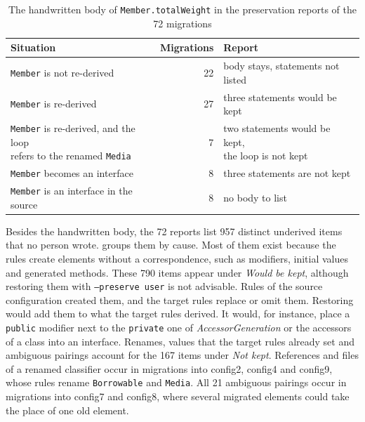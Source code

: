 \begin{table}[htbp]
    \centering
    \begin{tabular}{|l|r|l|}
        \hline
        \textbf{Situation}                            & \textbf{Migrations} & \textbf{Report}                   \\
        \hline
        \texttt{Member} is not re-derived             & 22                  & body stays, statements not listed \\
        \hline
        \texttt{Member} is re-derived                 & 27                  & three statements would be kept    \\
        \hline
        \makecell[l]{\texttt{Member} is re-derived, and the loop                                                \\ refers to the renamed \texttt{Media}} & 7 & \makecell[l]{two statements would be kept, \\ the loop is not kept} \\
        \hline
        \texttt{Member} becomes an interface          & 8                   & three statements are not kept     \\
        \hline
        \texttt{Member} is an interface in the source & 8                   & no body to list                   \\
        \hline
    \end{tabular}
    \caption{The handwritten body of \texttt{Member.totalWeight} in the preservation reports of the 72 migrations}
    \label{table:preservation-handwritten}
\end{table}

Besides the handwritten body, the 72 reports list 957 distinct underived items that no person wrote.
 groups them by cause.
Most of them exist because the rules create elements without a correspondence, such as modifiers, initial values and generated methods.
These 790 items appear under \textit{Would be kept}, although restoring them with \texttt{--preserve user} is not advisable.
Rules of the source configuration created them, and the target rules replace or omit them.
Restoring would add them to what the target rules derived.
It would, for instance, place a \texttt{public} modifier next to the \texttt{private} one of \textit{AccessorGeneration} or the accessors of a class into an interface.
Renames, values that the target rules already set and ambiguous pairings account for the 167 items under \textit{Not kept}.
References and files of a renamed classifier occur in migrations into config2, config4 and config9, whose rules rename \texttt{Borrowable} and \texttt{Media}.
All 21 ambiguous pairings occur in migrations into config7 and config8, where several migrated elements could take the place of one old element.

